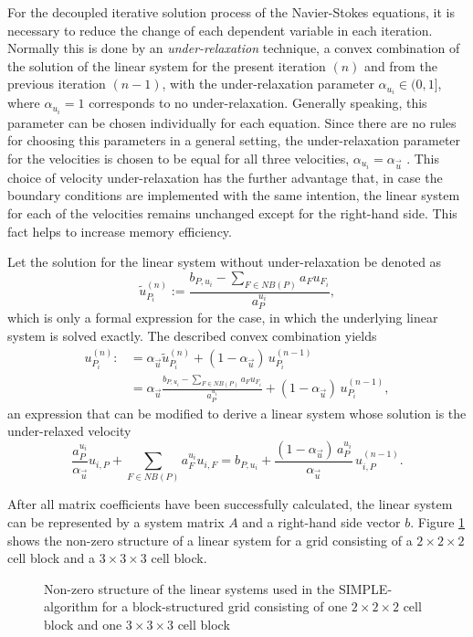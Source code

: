For the decoupled iterative solution process of the Navier-Stokes equations, it is necessary to reduce the change of each dependent variable in each iteration. Normally this is done by an \emph{under-relaxation} technique, a convex combination of the solution of the linear system for the present iteration \((n)\) and from the previous iteration \((n-1)\), with the under-relaxation parameter \(\alpha_{u_i} \in (0,1]\), where \(\alpha_{u_i} = 1\) corresponds to no under-relaxation. Generally speaking, this parameter can be chosen individually for each equation. Since there are no rules for choosing this parameters in a general setting, the under-relaxation parameter for the velocities is chosen to be equal for all three velocities, \(\alpha_{u_i} = \alpha_{\vec{u}}\) \cite{schaefer99}. This choice of velocity under-relaxation has the further advantage that, in case the boundary conditions are implemented with the same intention, the linear system for each of the velocities remains unchanged except for the right-hand side. This fact helps to increase memory efficiency.

Let the solution for the linear system without under-relaxation be denoted as
\begin{displaymath}
  \tilde{u}_{P_i}^{(n)} := \frac{b_{P,u_i} - \sum_{F \in NB(P)} a_F u_{F_i}}{a_P^{u_i}},
\end{displaymath}
which is only a formal expression for the case, in which the underlying linear system is solved exactly. The described convex combination yields
\begin{align*}
  u_{P_i}^{(n)} :&= \alpha_{\vec{u}} \tilde{u}_{P_i}^{(n)} + (1 - \alpha_{\vec{u}} )\, u_{P_i}^{(n-1)} \\[0.5em]
                 &= \alpha_{\vec{u}} \frac{b_{P,u_i} - \sum_{F \in NB(P)} a_F u_{F_i}}{a_P^{u_i}} + (1 - \alpha_{\vec{u}} )\, u_{P_i}^{(n-1)},
\end{align*}
an expression that can be modified to derive a linear system whose solution is the under-relaxed velocity
\begin{displaymath}
  \frac{a_P^{u_i}}{\alpha_{\vec{u}}} u_{i,P} + \sum_{F \in NB(P)} a_F^{u_i} u_{i,F} 
  = 
  b_{P,u_i} + \frac{(1 - \alpha_{\vec{u}})\, a_P^{u_i}}{\alpha_{\vec{u}}}\, u_{i,P}^{(n-1)}. 
\end{displaymath}

After all matrix coefficients have been successfully calculated, the linear system can be represented by a system matrix \(A\) and a right-hand side vector \(b\). Figure \ref{fig:segassemble} shows the non-zero structure of a linear system for a grid consisting of a \(2\times2\times2\) cell block and a \(3\times3\times3\) cell block.

\begin{figure}
  \centering
  
  \caption{Non-zero structure of the linear systems used in the SIMPLE-algorithm for a block-structured grid consisting of one $2\times2\times2$ cell block and one $3\times3\times3$ cell block}
  \label{fig:segassemble}
\end{figure}
